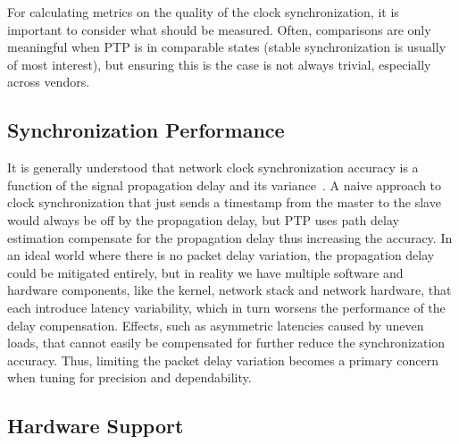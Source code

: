 For calculating metrics on the quality of the clock synchronization, it is important to consider what should be measured. Often, comparisons are only meaningful when PTP is in comparable states (stable synchronization is usually of most interest), but ensuring this is the case is not always trivial, especially across vendors.


\subsection{Synchronization Performance}
It is generally understood that network clock synchronization accuracy is a function of the signal propagation delay and its variance~\cite{managin-pdv-for-ptp}. A naive approach to clock synchronization that just sends a timestamp from the master to the slave would always be off by the propagation delay, but PTP uses path delay estimation compensate for the propagation delay thus increasing the accuracy. In an ideal world where there is no packet delay variation, the propagation delay could be mitigated entirely, but in reality we have multiple software and hardware components, like the kernel, network stack and network hardware, that each introduce latency variability, which in turn worsens the performance of the delay compensation. Effects, such as asymmetric latencies caused by uneven loads, that cannot easily be compensated for further reduce the synchronization accuracy. Thus, limiting the packet delay variation becomes a primary concern when tuning for precision and dependability.

\subsection{Hardware Support}

